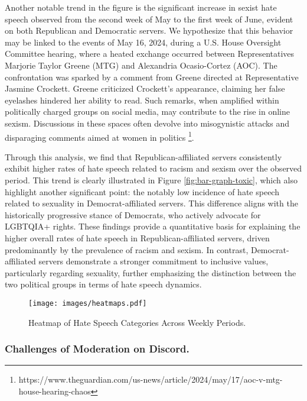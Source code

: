 Another notable trend in the figure is the significant increase in sexist hate speech observed from the second week of May to the first week of June, evident on both Republican and Democratic servers. We hypothesize that this behavior may be linked to the events of May 16, 2024, during a U.S. House Oversight Committee hearing, where a heated exchange occurred between Representatives Marjorie Taylor Greene (MTG) and Alexandria Ocasio-Cortez (AOC). The confrontation was sparked by a comment from Greene directed at Representative Jasmine Crockett. Greene criticized Crockett's appearance, claiming her false eyelashes hindered her ability to read. Such remarks, when amplified within politically charged groups on social media, may contribute to the rise in online sexism. Discussions in these spaces often devolve into misogynistic attacks and disparaging comments aimed at women in politics \footnote{https://www.theguardian.com/us-news/article/2024/may/17/aoc-v-mtg-house-hearing-chaos}.

Through this analysis, we find that Republican-affiliated servers consistently exhibit higher rates of hate speech related to racism and sexism over the observed period. This trend is clearly illustrated in Figure \ref{fig:bar-graph-toxic}, which also highlight another significant point: the notably low incidence of hate speech related to sexuality in Democrat-affiliated servers. This difference aligns with the historically progressive stance of Democrats, who actively advocate for LGBTQIA+ rights. These findings provide a quantitative basis for explaining the higher overall rates of hate speech in Republican-affiliated servers, driven predominantly by the prevalence of racism and sexism. In contrast, Democrat-affiliated servers demonstrate a stronger commitment to inclusive values, particularly regarding sexuality, further emphasizing the distinction between the two political groups in terms of hate speech dynamics.

\begin{figure}[h]
    \centering
    \texttt{[image: images/heatmaps.pdf]}
    \caption{Heatmap of Hate Speech Categories Across Weekly Periods.}
    \label{fig:all_hate}
\end{figure}

\subsubsection{Challenges of Moderation on Discord. \\}

